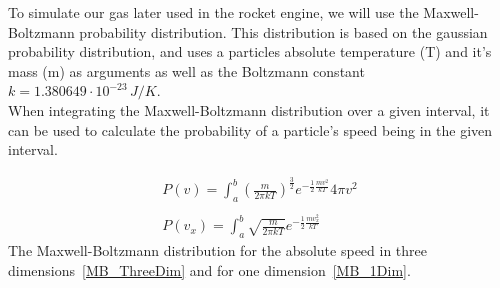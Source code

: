 \documentclass[reprint,english,notitlepage]{revtex4-2}
\begin{document}
To simulate our gas later used in the rocket engine, we will use the Maxwell-Boltzmann probability distribution.
This distribution is based on the gaussian probability distribution, and uses a particles absolute temperature (T) and it's mass (m) as arguments as well as the Boltzmann constant
$k = 1.380649 \cdot 10^{-23}\,J/K$.
\\When integrating the Maxwell-Boltzmann distribution over a given interval, it can be used to calculate the probability of a particle's speed being in the given interval.

\begin{align}
	P(v) = \int_{a}^{b} \left(\frac{m}{2\pi kT}\right)^{\frac{3}{2}} e^{-\frac{1}{2}\frac{mv^2}{kT}} 4\pi v^2 \label{MB_ThreeDim}\\
	\nonumber \\
    P(v_x) = \int_{a}^{b} \sqrt{\frac{m}{2\pi kT}} e^{-\frac{1}{2}\frac{mv_{x}^2}{kT}} \label{MB_1Dim}
\end{align}
The Maxwell-Boltzmann distribution for the absolute speed in three dimensions~\ref{MB_ThreeDim} and for one dimension~\ref{MB_1Dim}.
\end{document}
